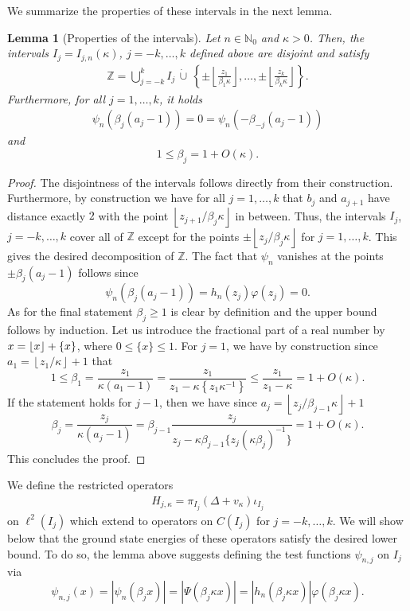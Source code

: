 \documentclass[12pt, reqno]{amsart}
\newtheorem{lemma}[theorem]{Lemma}
\theoremstyle{definition}
\numberwithin{equation}{section}
\newcommand{\Z}{{\mathbb Z}}
\newcommand{\N}{{\mathbb N}}
\DeclarePairedDelimiter\floor{\lfloor}{\rfloor}
\begin{document}
We summarize the properties of these intervals in the next lemma.
\begin{lemma}[Properties of the intervals]\label{lem:intervals}
    Let $n\in \N_0$ and $\kappa>0$. Then, the intervals $I_j=I_{j,n}(\kappa)$, $j=-k,\ldots,k$ defined above are disjoint and satisfy
   \begin{align*}
    \Z = \bigcup_{j=-k}^{k} I_j \,\dot\cup   \, \left\{\pm\left\lfloor {\frac{z_1}{\beta_1\kappa}  }\right\rfloor , \ldots,\pm\left\lfloor  {\frac{z_k}{\beta_k\kappa}  }\right\rfloor \right\}.
\end{align*} 
Furthermore, for all $j=1,\ldots,k$, it holds
\begin{align*}
    \psi_n(\beta_j (a_j-1))=0=\psi_n(-\beta_{-j} (a_j-1))
\end{align*}
and
$$1\le \beta_j=1+O(\kappa).$$ 
\end{lemma}
\begin{proof}
The disjointness of the intervals follows directly from their construction. Furthermore, by construction we have for all $j=1,\ldots,k$ that $b_j$ and $a_{j+1}$ have distance exactly $2$ with the point $\left\lfloor{z_{j+1}}/{\beta_j\kappa}\right\rfloor$ in between. Thus, the intervals $I_j$, $j=-k,\ldots,k$ cover all of $\Z$ except for the points $\pm\left\lfloor {{z_j}/{\beta_j\kappa}  }\right\rfloor$ for $j=1,\ldots,k$. This gives the desired decomposition of $\Z$. 
The fact that $ \psi_n$ vanishes at the points $\pm\beta_j (a_j-1)$ follows
since
$$\psi_n(\beta_j (a_j-1))=h_n(z_j)\varphi(z_j)=0.$$
As for the final statement   $\beta_j\ge 1$ is clear by definition and the upper bound  follows by induction. {Let us introduce the fractional part of a real number by $x = \floor{x} + \{x\}$, where $0\leq \{x\}\leq 1$. For $j=1$, we have by construction since $a_1=\left\lfloor{z_1}/{\kappa}\right\rfloor+1$ that
$$1\leq \beta_1=\frac{z_1}{\kappa (a_1-1)}  = \frac{z_1}{z_1 - \kappa\left\{ z_1 \kappa^{-1} \right\}}\le  {\frac{z_1}{z_1 - \kappa}} =1+O(\kappa).$$
If the statement holds for $j-1$, then we have since $a_j=\left\lfloor{z_j}/{\beta_{j-1}\kappa}\right\rfloor+1$  
$$\beta_j=\frac{z_j}{\kappa (a_j-1)}=\beta_{j-1}\frac{z_j}{z_j - \kappa \beta_{j-1}\{z_j (\kappa\beta_j)^{-1}\}}=1+O(\kappa).$$} 
This concludes the proof.
\end{proof}

We define the restricted operators
\begin{align*}
    H_{j,\kappa}  = \pi_{I_j} (\Delta + v_\kappa)\iota_{I_j}
\end{align*}
on $\ell^2(I_j)$  which extend to operators on $C(I_j)$ for $j=-k,\ldots,k$. We will show below  that the ground state energies of these operators satisfy the desired lower bound. To do so, the lemma above suggests defining the test functions $\psi_{n,j}$ on $I_j$ via
    $$\psi_{n,j}(x)= |\psi_n(\beta_j x)|= |\Psi(\beta_j\kappa x)|= |h_n(\beta_j\kappa x)| \varphi(\beta_j\kappa x).$$
\end{document}
